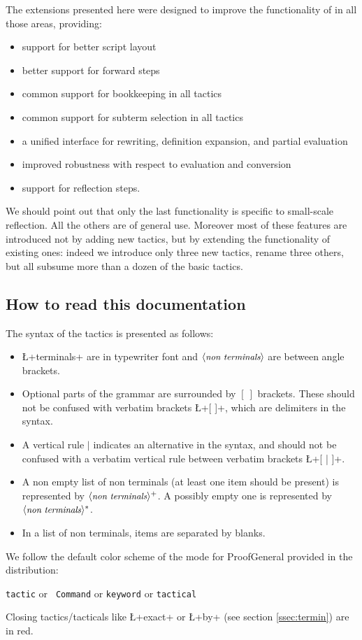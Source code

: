 The extensions presented here were designed to improve the
functionality of \Coq{} in all those areas, providing:

\begin{itemize}
\item support for better script layout
\item better support for forward steps
\item common
support for bookkeeping in all tactics
\item common support for subterm
selection in all tactics
\item a unified interface for rewriting,
definition expansion, and partial evaluation
\item improved robustness
with respect to evaluation and conversion
\item support for reflection
steps.
\end{itemize}
 We should point out that only the last functionality is specific
to small-scale reflection. All the others are of general use.
Moreover most of these features are introduced not
by adding new tactics, but by extending the functionality of existing
ones: indeed we introduce only three new tactics, rename three others,
but all subsume more than a dozen of the basic \Coq{} tactics.


\subsection*{How to read this documentation}


The syntax of the tactics is presented as follows:
\begin{itemize}
\item \L+terminals+ are in typewriter font and $\langle\mbox{\itshape\rmfamily\small non terminals}\rangle$ are
  between angle brackets.
\item Optional parts of the grammar are surrounded by $[\ ]$
  brackets. These should not be confused with verbatim brackets
  \L+[ ]+, which are delimiters in the \ssr{} syntax.
\item A vertical rule $|$ indicates an alternative in the syntax, and
  should not be confused with a
  verbatim vertical rule between verbatim brackets \L+[ | ]+.
\item A non empty list of non terminals (at least one item should be
  present) is represented by $\langle\mbox{\itshape\rmfamily\small non terminals}\rangle^+$. A possibly empty
  one is represented by $\langle\mbox{\itshape\rmfamily\small non terminals}\rangle^*$.
\item In a list of non terminals, items are separated by blanks.
\end{itemize}


\noindent We follow the default color scheme of the \ssr{} mode for
ProofGeneral provided in the distribution:

\centerline{
\textcolor{dkblue}{\texttt{tactic}} or \textcolor{dkviolet}{\tt
  Command} or \textcolor{dkgreen}{\tt keyword} or
\textcolor{dkpink}{\tt tactical}}

\noindent Closing tactics/tacticals like \L+exact+ or \L+by+ (see section
\ref{ssec:termin}) are in red.

\newpage